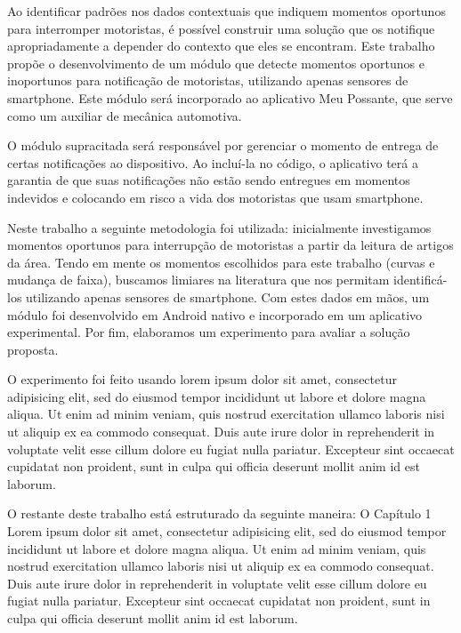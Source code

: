 Ao identificar padrões nos dados contextuais que indiquem momentos oportunos para interromper motoristas, é possível
construir uma solução que os notifique apropriadamente a depender do contexto que eles se encontram. Este trabalho propõe
o desenvolvimento de um módulo que detecte momentos oportunos e inoportunos para notificação de motoristas, utilizando
apenas sensores de smartphone. Este módulo será incorporado ao aplicativo Meu Possante, que serve como um auxiliar de mecânica automotiva.

O módulo supracitada será responsável por gerenciar o momento de entrega de certas notificações ao dispositivo. Ao incluí-la no código,
o aplicativo terá a garantia de que suas notificações não estão sendo entregues em momentos indevidos e colocando em risco a vida dos
motoristas que usam smartphone.

Neste trabalho a seguinte metodologia foi utilizada: inicialmente investigamos momentos oportunos para interrupção de motoristas a partir
da leitura de artigos da área. Tendo em mente os momentos escolhidos para este trabalho (curvas e mudança de faixa), buscamos limiares na
literatura que nos permitam identificá-los utilizando apenas sensores de smartphone. Com estes dados em mãos, um módulo foi desenvolvido
em Android nativo e incorporado em um aplicativo experimental. Por fim, elaboramos um experimento para avaliar a solução proposta.

O experimento foi feito usando lorem ipsum dolor sit amet, consectetur adipisicing elit, sed do eiusmod tempor incididunt ut labore et dolore
magna aliqua. Ut enim ad minim veniam, quis nostrud exercitation ullamco laboris nisi ut aliquip ex ea commodo consequat. Duis aute irure dolor
in reprehenderit in voluptate velit esse cillum dolore eu fugiat nulla pariatur. Excepteur sint occaecat cupidatat non proident, sunt in
culpa qui officia deserunt mollit anim id est laborum.

O restante deste trabalho está estruturado da seguinte maneira: O Capítulo 1 Lorem ipsum dolor sit amet, consectetur adipisicing elit, sed do
eiusmod tempor incididunt ut labore et dolore magna aliqua. Ut enim ad minim veniam, quis nostrud exercitation ullamco laboris nisi ut aliquip
ex ea commodo consequat. Duis aute irure dolor in reprehenderit in voluptate velit esse cillum dolore eu fugiat nulla pariatur. Excepteur sint
occaecat cupidatat non proident, sunt in culpa qui officia deserunt mollit anim id est laborum.
